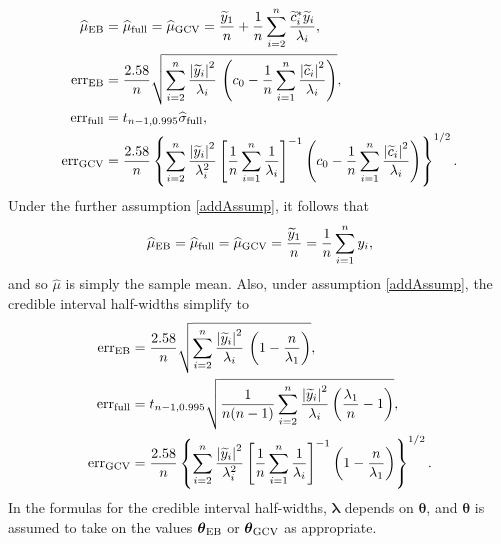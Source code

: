 \documentclass{svjour3}                     %
\newcommand{\bm}[1]{\boldsymbol{#1}}
\newcommand{\vlambda}{{\bm{\lambda}}}
\newcommand{\vtheta}{{\bm{\theta}}}
\newcommand{\hmu}{\widehat{\mu}}
\newcommand{\hsigma}{\widehat{\sigma}}
\newcommand{\MLE}{\textup{EB}}
\newcommand{\full}{\textup{full}}
\newcommand{\GCV}{\textup{GCV}}
\newcommand{\err}{\textup{err}}
\def\abs#1{\ensuremath{\left \lvert #1 \right \rvert}}
\begin{document}
\begin{theorem}
\begin{subequations}
\end{subequations}
\begin{align}
\nonumber
\hmu_\MLE  &= \hmu_{\full} = \hmu_{\GCV} =
\frac{\widetilde{y}_1}{n} +
\frac 1n \sum_{i=2}^n \frac{ \widetilde{c}_i^* \widetilde{y}_i}{\lambda_i}, \\
\nonumber
\err_\MLE  &
=
\frac{2.58}{n}\sqrt{
	\sum_{i=2}^{n} \frac{\abs{\widetilde{y}_i}^2}{\lambda_i}  
	\,
	\left( c_0 - \frac 1n \sum_{i=1}^n \frac{\abs{\widetilde{c}_i}^2}{\lambda_i} \right) 
}, \\
\nonumber
\err_{\full} & = t_{n-1,0.995} \hsigma_{\textup{full}}, \\
\nonumber
\err_{\textup{GCV}} & =
\frac{2.58}{n}\left\{\sum_{i=2}^n \frac{\abs{\widetilde{y}_i}^2}{\lambda_i^2}  \left [ \frac 1n \sum_{i=1}^n \frac{1}{\lambda_i} \right]^{-1} 
\left( c_0 - \frac 1n \sum_{i=1}^n \frac{\abs{\widetilde{c}_i}^2}{\lambda_i} \right) 
\right\}^{1/2}.
\end{align}
Under the further assumption \eqref{addAssump}, it follows that 
\begin{equation}
\label{muhatGCV-FB-MLE-Simple}
\hmu_\MLE  = \hmu_{\full} = \hmu_{\GCV} =
\frac{\widetilde{y}_1}{n} = \frac 1n \sum_{i=1}^n y_i,
\end{equation}
and so $\hmu$ is simply the sample mean.  Also, under assumption \eqref{addAssump}, the credible interval half-widths simplify to
\begin{subequations}
\label{errSimple}
\begin{align}
\label{eq:errMLEAllAsump}
\err_\MLE  &
=
\frac{2.58}{n}\sqrt{
	\sum_{i=2}^{n} \frac{\abs{\widetilde{y}_i}^2}{\lambda_i}  
	\,
	\left( 1 -  \frac{n}{\lambda_1} \right) 
}, \\
\label{FJH:eq:errFullSimple}
\err_{\textup{full}}
&=
t_{n-1,0.995}
\sqrt{\frac{1}{n(n-1)} \sum_{i=2}^n \frac{\abs{\widetilde{y}_i}^2}{\lambda_i}  \left(\frac{\lambda_1}{n}  - 1  \right)}, \\
\nonumber
\err_{\textup{GCV}} & =
\frac{2.58}{n}\left\{\sum_{i=2}^n \frac{\abs{\widetilde{y}_i}^2}{\lambda_i^2}  \left [ \frac 1n \sum_{i=1}^n \frac{1}{\lambda_i} \right]^{-1} 
\left( 1 -  \frac{n}{\lambda_1} \right)  
\right\}^{1/2}. \label{errGCVSimple}
\end{align}
\end{subequations}
In the formulas for the credible interval half-widths, $\vlambda$ depends on $\vtheta$, and  $\vtheta$ is assumed to take on the values $\vtheta_{\MLE}$ or $\vtheta_{\GCV}$ as appropriate.
\end{theorem}
\end{document}
